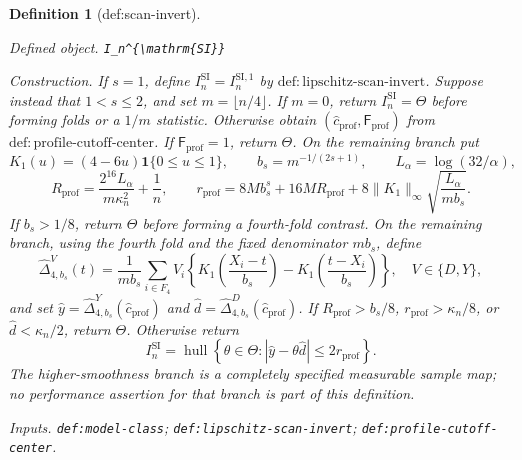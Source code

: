 \documentclass{article}
\newtheorem{definition}{Definition}
\begin{document}
\begin{definition}[def:scan-invert]\label{def:scan-invert}
\par\smallskip\noindent\emph{Defined object.} \texttt{I\_\allowbreak{}n\textasciicircum{}\{\textbackslash{}\allowbreak{}mathrm\{SI\}\allowbreak{}\}\allowbreak{}}
\par\smallskip\noindent\emph{Construction.} If \(s=1\), define \(I_n^{\mathrm{SI}}=I_n^{\mathrm{SI},1}\) by
\(\mathrm{def:lipschitz\mbox{-}scan\mbox{-}invert}\).  Suppose instead
that \(1<s\le2\), and set \(m=\lfloor n/4\rfloor\).  If \(m=0\),
return \(I_n^{\mathrm{SI}}=\Theta\) before forming folds or a
\(1/m\) statistic.  Otherwise obtain
\((\widehat c_{\mathrm{prof}},\mathsf F_{\mathrm{prof}})\) from
\(\mathrm{def:profile\mbox{-}cutoff\mbox{-}center}\).  If
\(\mathsf F_{\mathrm{prof}}=1\), return \(\Theta\).  On the remaining
branch put
\[
 K_1(u)=(4-6u)\mathbf 1\{0\le u\le1\},\qquad
 b_s=m^{-1/(2s+1)},\qquad L_\alpha=\log(32/\alpha),
\]
\[
 R_{\mathrm{prof}}
 =\frac{2^{16}L_\alpha}{m\kappa_n^2}+\frac1n,
 \qquad
 r_{\mathrm{prof}}
 =8Mb_s^s+16MR_{\mathrm{prof}}
  +8\|K_1\|_\infty
     \sqrt{\frac{L_\alpha}{mb_s}}.
\]
If \(b_s>1/8\), return \(\Theta\) before forming a fourth-fold
contrast.  On the remaining branch, using the fourth fold and the
fixed denominator \(mb_s\), define
\[
 \widehat\Delta_{4,b_s}^{V}(t)
 =\frac1{mb_s}\sum_{i\in F_4}V_i
 \left\{K_1\!\left(\frac{X_i-t}{b_s}\right)
       -K_1\!\left(\frac{t-X_i}{b_s}\right)\right\},
 \quad V\in\{D,Y\},
\]
and set \(\widehat y=\widehat\Delta_{4,b_s}^{Y}
(\widehat c_{\mathrm{prof}})\) and
\(\widehat d=\widehat\Delta_{4,b_s}^{D}
(\widehat c_{\mathrm{prof}})\).  If
\(R_{\mathrm{prof}}>b_s/8\), \(r_{\mathrm{prof}}>\kappa_n/8\), or
\(\widehat d<\kappa_n/2\), return \(\Theta\).  Otherwise return
\[
 I_n^{\mathrm{SI}}
 =\operatorname{hull}\left\{\theta\in\Theta:
 |\widehat y-\theta\widehat d|\le2r_{\mathrm{prof}}\right\}.
\]
The higher-smoothness branch is a completely specified measurable
sample map; no performance assertion for that branch is part of this
definition.
\par\smallskip\noindent\emph{Inputs.} \texttt{def:\allowbreak{}model-\allowbreak{}class}; \texttt{def:\allowbreak{}lipschitz-\allowbreak{}scan-\allowbreak{}invert}; \texttt{def:\allowbreak{}profile-\allowbreak{}cutoff-\allowbreak{}center}.
\end{definition}
\end{document}
